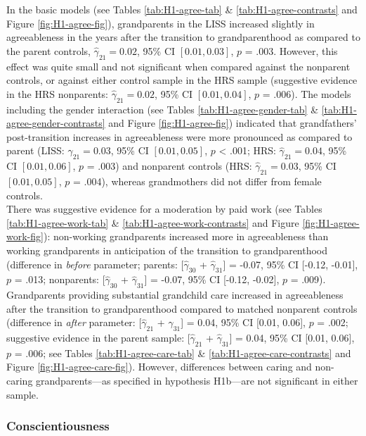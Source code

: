 \documentclass[
  english,
  man, noextraspace]{apa7}
\begin{document}
In the basic models (see Tables \ref{tab:H1-agree-tab} \& \ref{tab:H1-agree-contrasts} and Figure \ref{fig:H1-agree-fig}), grandparents in the LISS increased slightly in agreeableness in the years after the transition to grandparenthood as compared to the parent controls, \(\hat{\gamma}_{21} = 0.02\), 95\% CI \([0.01, 0.03]\), \(p\) = .003. However, this effect was quite small and not significant when compared against the nonparent controls, or against either control sample in the HRS sample (suggestive evidence in the HRS nonparents: \(\hat{\gamma}_{21} = 0.02\), 95\% CI \([0.01, 0.04]\), \(p\) = .006). The models including the gender interaction (see Tables \ref{tab:H1-agree-gender-tab} \& \ref{tab:H1-agree-gender-contrasts} and Figure \ref{fig:H1-agree-fig}) indicated that grandfathers' post-transition increases in agreeableness were more pronounced as compared to parent (LISS: \(\hat{\gamma}_{21} = 0.03\), 95\% CI \([0.01, 0.05]\), \(p\) \textless{} .001; HRS: \(\hat{\gamma}_{21} = 0.04\), 95\% CI \([0.01, 0.06]\), \(p\) = .003) and nonparent controls (HRS: \(\hat{\gamma}_{21} = 0.03\), 95\% CI \([0.01, 0.05]\), \(p\) = .004), whereas grandmothers did not differ from female controls.\\
There was suggestive evidence for a moderation by paid work (see Tables \ref{tab:H1-agree-work-tab} \& \ref{tab:H1-agree-work-contrasts} and Figure \ref{fig:H1-agree-work-fig}): non-working grandparents increased more in agreeableness than working grandparents in anticipation of the transition to grandparenthood (difference in \emph{before} parameter; parents: {[}\(\hat{\gamma}_{30}\) + \(\hat{\gamma}_{31}\){]} = -0.07, 95\% CI {[}-0.12, -0.01{]}, \(p\) = .013; nonparents: {[}\(\hat{\gamma}_{30}\) + \(\hat{\gamma}_{31}\){]} = -0.07, 95\% CI {[}-0.12, -0.02{]}, \(p\) = .009). Grandparents providing substantial grandchild care increased in agreeableness after the transition to grandparenthood compared to matched nonparent controls (difference in \emph{after} parameter: {[}\(\hat{\gamma}_{21}\) + \(\hat{\gamma}_{31}\){]} = 0.04, 95\% CI {[}0.01, 0.06{]}, \(p\) = .002; suggestive evidence in the parent sample: {[}\(\hat{\gamma}_{21}\) + \(\hat{\gamma}_{31}\){]} = 0.04, 95\% CI {[}0.01, 0.06{]}, \(p\) = .006; see Tables \ref{tab:H1-agree-care-tab} \& \ref{tab:H1-agree-care-contrasts} and Figure \ref{fig:H1-agree-care-fig}). However, differences between caring and non-caring grandparents---as specified in hypothesis H1b---are not significant in either sample.

\hypertarget{conscientiousness}{%
\subsubsection{Conscientiousness}\label{conscientiousness}}
\end{document}

